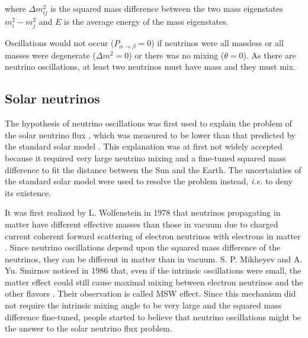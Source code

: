 where $\Delta m^{2}_{ij}$ is the squared mass difference between the
two mass eigenstates $m^{2}_{i} - m^{2}_{j}$ and $E$ is the average
energy of the mass eigenstates.

Oscillations would not occur ($P_{\alpha \rightarrow \beta} = 0$) if
neutrinos were all massless or all masses were degenerate ($\Delta
m^{2} = 0$) or there was no mixing ($\theta = 0$). As there are
neutrino oscillations, at least two neutrinos must have mass and they
must mix.

\subsection{Solar neutrinos}
\label{sec:solar}
The hypothesis of neutrino oscillations was first used to explain the
problem of the solar neutrino flux \cite{Dav64, Dav68}, which was
measured to be lower than that predicted by the standard solar model
\cite{Bah98}. This explanation was at first not widely accepted
because it required very large neutrino mixing and a fine-tuned
squared mass difference to fit the distance between the Sun and the
Earth. The uncertainties of the standard solar model were used to
resolve the problem instead, \textit{i.e.} to deny its existence.

It was first realized by L. Wolfenstein in 1978 that neutrinos
propagating in matter have different effective masses than those in
vacuum due to charged current coherent forward scattering of electron
neutrinos with electrons in matter \cite{Wol78}. Since neutrino
oscillations depend upon the squared mass difference of the neutrinos,
they can be different in matter than in vacuum. S. P. Mikheyev and
A. Yu. Smirnov noticed in 1986 that, even if the intrinsic
oscillations were small, the matter effect could still cause maximal
mixing between electron neutrinos and the other flavors
\cite{Mik86}. Their observation is called MSW effect. Since this
mechanism did not require the intrinsic mixing angle to be very large
and the squared mass difference fine-tuned, people started to believe
that neutrino oscillations might be the answer to the solar neutrino
flux problem.

